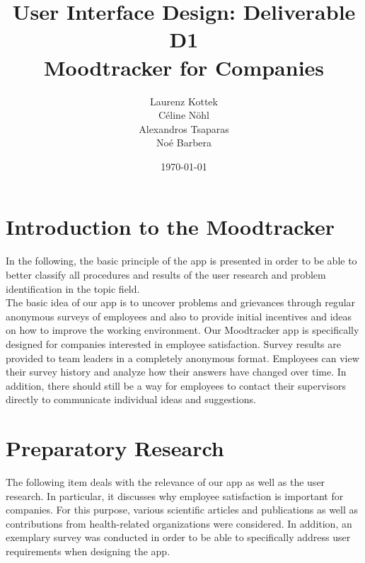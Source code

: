 \documentclass[11pt]{article}
\title{\textbf{User Interface Design: Deliverable D1}\\Moodtracker for Companies}
\author{Laurenz Kottek\\ Céline Nöhl\\ Alexandros Tsaparas\\ Noé Barbera}
\date{\today}
\begin{document}
{}
\maketitle 

\vspace{15mm}


\tableofcontents
\newpage


\section{Introduction to the Moodtracker}
In the following, the basic principle of the app is presented in order to be able to better classify all procedures and results of the user research and problem identification in the topic field.\\
The basic idea of our app is to uncover problems and grievances through regular anonymous surveys of employees and also to provide initial incentives and ideas on how to improve the working environment. Our Moodtracker app is specifically designed for companies interested in employee satisfaction. Survey results are provided to team leaders in a completely anonymous format. Employees can view their survey history and analyze how their answers have changed over time. In addition, there should still be a way for employees to contact their supervisors directly to communicate individual ideas and suggestions.
\section{Preparatory Research}
The following item deals with the relevance of our app as well as the user research. In particular, it discusses why employee satisfaction is important for companies. For this purpose, various scientific articles and publications as well as contributions from health-related organizations were considered. In addition, an exemplary survey was conducted in order to be able to specifically address user requirements when designing the app.
\end{document}

